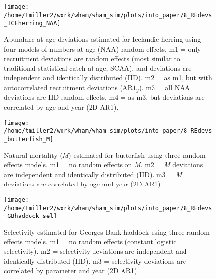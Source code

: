\documentclass[]{article}
\begin{document}
\begin{figure}

{\centering \texttt{[image: /home/tmiller2/work/wham/wham\_sim/plots/into\_paper/8\_REdevs\_ICEherring\_NAA]} 

}

\caption{Abundanc-at-age deviations estimated for Icelandic herring using four models of numbers-at-age (NAA) random effects. m1 = only recruitment deviations are random effects (most similar to traditional statistical catch-at-age, SCAA), and deviations are independent and identically distributed (IID). m2 = as m1, but with autocorrelated recruitment deviations ($\text{AR1}_y$). m3 = all NAA deviations are IID random effects. m4 = as m3, but deviations are correlated by age and year (2D AR1).}\label{fig:devs-ICEherring-naa}
\end{figure}

\pagebreak

\begin{figure}

{\centering \texttt{[image: /home/tmiller2/work/wham/wham\_sim/plots/into\_paper/8\_REdevs\_butterfish\_M]} 

}

\caption{Natural mortality (\textit{M}) estimated for butterfish using three random effects models. m1 = no random effects on \textit{M}. m2 = \textit{M} deviations are independent and identically distributed (IID). m3 = \textit{M} deviations are correlated by age and year (2D AR1).}\label{fig:devs-butterfish-m}
\end{figure}

\pagebreak

\begin{figure}

{\centering \texttt{[image: /home/tmiller2/work/wham/wham\_sim/plots/into\_paper/8\_REdevs\_GBhaddock\_sel]} 

}

\caption{Selectivity estimated for Georges Bank haddock using three random effects models. m1 = no random effects (constant logistic selectivity). m2 = selectivity deviations are independent and identically distributed (IID). m3 = selectivity deviations are correlated by parameter and year (2D AR1).}\label{fig:devs-GBhaddock-sel}
\end{figure}

\pagebreak
\end{document}
